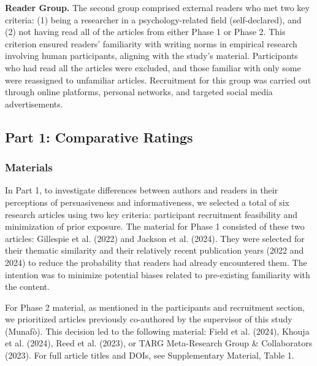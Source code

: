 \documentclass[authordate, meta]{jote-new-article}
\begin{document}
	\textbf{Reader Group.} The second group comprised external readers who met two key criteria: (1) being a researcher in a psychology-related field (self-declared), and (2) not having read all of the articles from either Phase 1 or Phase 2. This criterion ensured readers' familiarity with writing norms in empirical research involving human participants, aligning with the study's material. Participants who had read all the articles were excluded, and those familiar with only some were reassigned to unfamiliar articles. Recruitment for this group was carried out through online platforms, personal networks, and targeted social media advertisements.



	\subsection{Part 1: Comparative Ratings}



	\subsubsection{Materials}



	In Part 1, to investigate differences between authors and readers in their perceptions of persuasiveness and informativeness, we selected a total of six research articles using two key criteria: participant recruitment feasibility and minimization of prior exposure. The material for Phase 1 consisted of these two articles: Gillespie et al. (2022) and Jackson et al. (2024). They were selected for their thematic similarity and their relatively recent publication years (2022 and 2024) to reduce the probability that readers had already encountered them. The intention was to minimize potential biases related to pre-existing familiarity with the content.



	For Phase 2 material, as mentioned in the participants and recruitment section, we prioritized articles previously co-authored by the supervisor of this study (Munafò). This decision led to the following material: Field et al. (2024), Khouja et al. (2024), Reed et al. (2023), or TARG Meta-Research Group \& Collaborators (2023). For full article titles and DOIs, see Supplementary Material, Table 1.
\end{document}
